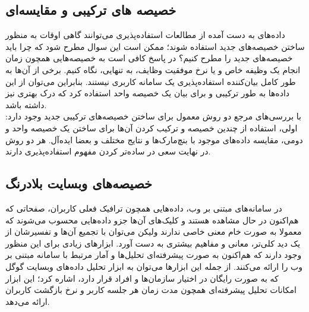 \subsection{خصیصه های ترکیبی و مقایسه‌ای}
داده‌های به دست آمده از مطالعات استفاده‌پذیری می‌توانند گاهی اوقات به منظور ساختن خصیصه‌های جدید استفاده شوند؛ ممکن است این سوال مطرح شود که چرا باید خصیصه‌های جدید را مطرح کنیم؟ در پاسخ کافی است به خصیصه‌هایی همچون زمان انجام یک وظیفه خاص و یا نرخ موفقیت وظایف، به تنهایی، نگاه کنیم. برخی از آن‌ها به طور کامل بیان‌کننده استفاده‌پذیری یک سامانه کاربری نیستند. بنابراین می‌توان از این داده‌ها به طور ترکیبی و برای بیان یک خصیصه واحد استفاده کرد که درک بهتری نیز داشته باشد.\\
با بررسی‌های مرجع
\cite{albert_measuring_2013}
دو روش معمول برای ساختن خصیصه‌های ترکیبی جدید وجود دارد: اولی، استفاده از چندین خصیصه و ترکیب کردن ‌آن‌ها برای ساختن یک خصیصه واحد و دومی، مقایسه داده‌های موجود با بنچ‌مارک‌ها و نتایج مختلف و بعضا ایده‌آل. هر دو روش در نهایت سعی در ساده‌تر کردن مفهوم استفاده‌پذیری دارند.
\subsection{خصیصه‌های وبسایت بلادرنگ}
در سامانه‌های مبتنی بر وب، داده‌هایی همچون ترافیک فعلی کاربران، صفحاتی که هم‌اکنون در حال مشاهده هستند و کلیک‌های آن‌ها جزو داده‌هایی محسوب می‌شوند که معمولا به صورت خام معنی خاصی ندارند ولیکن می‌توان با تجمیع آن‌ها و تفسیرشان از یک دید کلی‌تر، معانی و مفاهیم بیشتری به دست آورد. ابزارهای زیادی برای این منظور وجود دارند که هم‌اکنون به صورت پیشرفته‌ای تحلیل‌ها و آمار مرتبط با سامانه مبتنی بر وب را ارائه می‌کنند. از جمله این ابزارها می‌توان به ابزار تحلیل داده‌های وبسایت گوگل که به صورت رایگان در اختیار سازمان‌ها و افراد قرار دارد، اشاره کرد؛ این ابزار امکانات تحلیل پیشرفته‌ای همچون مدت زمان هر جلسه کاربر
 و نرخ بازگشت کاربران ارائه می‌دهد.
